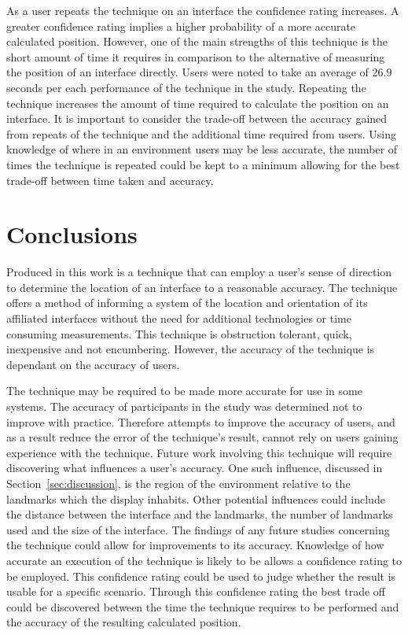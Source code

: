 \documentclass{bmcart}
\begin{document}
As a user repeats the technique on an interface the confidence rating increases.
A greater confidence rating implies a higher probability of a more accurate calculated position.
However, one of the main strengths of this technique is the short amount of time it requires in comparison to the alternative of measuring the position of an interface directly.
Users were noted to take an average of 26.9 seconds per each performance of the technique in the study.
Repeating the technique increases the amount of time required to calculate the position on an interface.
It is important to consider the trade-off between the accuracy gained from repeats of the technique and the additional time required from users.
Using knowledge of where in an environment users may be less accurate, the number of times the technique is repeated could be kept to a minimum allowing for the best trade-off between time taken and accuracy.


\section*{Conclusions}\label{sec:conclusion}


Produced in this work is a technique that can employ a user's sense of direction to determine the location of an interface to a reasonable accuracy.
The technique offers a method of informing a system of the location and orientation of its affiliated interfaces without the need for additional technologies or time consuming measurements. 
This technique is obstruction tolerant, quick, inexpensive and not encumbering.
However, the accuracy of the technique is dependant on the accuracy of users.

The technique may be required to be made more accurate for use in some systems.
The accuracy of participants in the study was determined not to improve with practice.
Therefore attempts to improve the accuracy of users, and as a result reduce the error of the technique's result, cannot rely on users gaining experience with the technique.
Future work involving this technique will require discovering what influences a user's accuracy.
One such influence, discussed in Section~\ref{sec:discussion}, is the region of the environment relative to the landmarks which the display inhabits.
Other potential influences could include the distance between the interface and the landmarks, the number of landmarks used and the size of the interface.
The findings of any future studies concerning the technique could allow for improvements to its accuracy.
Knowledge of how accurate an execution of the technique is likely to be allows a confidence rating to be employed.
This confidence rating could be used to judge whether the result is usable for a specific scenario.
Through this confidence rating the best trade off could be discovered between the time the technique requires to be performed and the accuracy of the resulting calculated position.
\end{document}
